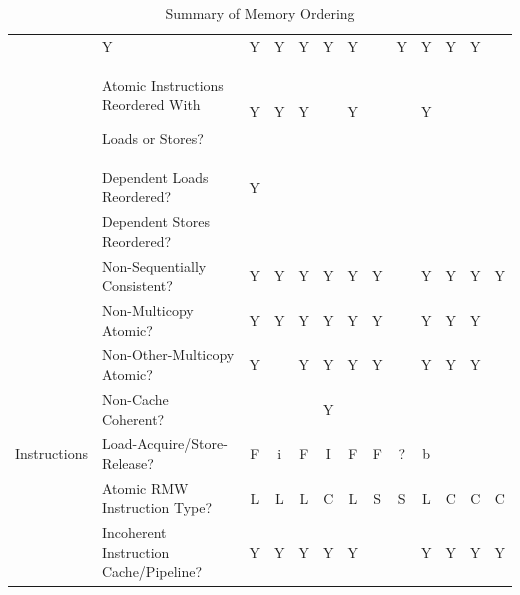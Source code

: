 \begin{table}[tbh]
\begin{tabular}{llccccccccccc}
		 & Y   & Y   & Y   & Y     & Y  & Y     & ~   & Y & Y   & Y & Y \\
	& \parbox[c][6ex]{2in}{\raggedright Atomic Instructions Reordered With\par Loads or Stores?}
		 & Y   & Y   & Y   & ~     & Y  & ~     & ~   & Y & ~   & ~ & ~ \\
	& Dependent Loads Reordered?
		 & Y   & ~   & ~   & ~     & ~  & ~     & ~   & ~ & ~   & ~ & ~ \\
	& Dependent Stores Reordered?
		 & ~   & ~   & ~   & ~     & ~  & ~     & ~   & ~ & ~   & ~ & ~ \\
	& Non-Sequentially Consistent?
		 & Y   & Y   & Y   & Y     & Y  & Y     & ~   & Y & Y   & Y & Y \\
	& Non-Multicopy Atomic?
		 & Y   & Y   & Y   & Y     & Y  & Y     & ~   & Y & Y   & Y & ~ \\
	& Non-Other-Multicopy Atomic?
		 & Y   & ~   & Y   & Y     & Y  & Y     & ~   & Y & Y   & Y & ~ \\
	& Non-Cache Coherent?
		 & ~   & ~   & ~   & Y     & ~  & ~     & ~   & ~ & ~   & ~ & ~ \\
	\cmidrule(r){1-2} 
	Instructions
	& Load-Acquire/Store-Release?
		 & F   & i   & F   & I     & F  & F     & ?   & b & ~   & ~ & ~ \\
	& Atomic RMW Instruction Type?
		 & L   & L   & L   & C     & L  & S     & S   & L & C   & C & C \\
	& Incoherent Instruction Cache/Pipeline?
		 & Y   & Y   & Y   & Y     & Y  & ~     & ~   & Y & Y   & Y & Y \\
	\bottomrule
\end{tabular}

\vspace{5pt}\hfill
{}\OneColumnHSpace{-0.7in}
\caption{Summary of Memory Ordering}
\label{tab:memorder:Summary of Memory Ordering}
\end{table}

